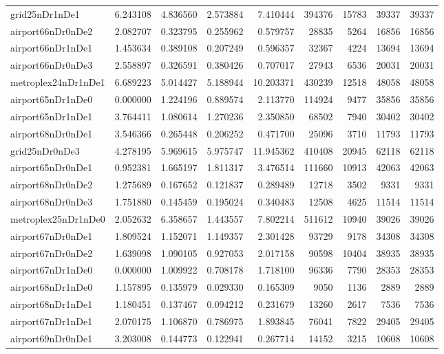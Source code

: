 \begin{longtable}{|l|r|r|r|r|r|r|r|r|}
grid25nDr1nDe1 & 6.243108 & 4.836560 & 2.573884 & 7.410444 & 394376 & 15783 & 39337 & 39337 \\
airport66nDr0nDe2 & 2.082707 & 0.323795 & 0.255962 & 0.579757 & 28835 & 5264 & 16856 & 16856 \\
airport66nDr1nDe1 & 1.453634 & 0.389108 & 0.207249 & 0.596357 & 32367 & 4224 & 13694 & 13694 \\
airport66nDr0nDe3 & 2.558897 & 0.326591 & 0.380426 & 0.707017 & 27943 & 6536 & 20031 & 20031 \\
metroplex24nDr1nDe1 & 6.689223 & 5.014427 & 5.188944 & 10.203371 & 430239 & 12518 & 48058 & 48058 \\
airport65nDr1nDe0 & 0.000000 & 1.224196 & 0.889574 & 2.113770 & 114924 & 9477 & 35856 & 35856 \\
airport65nDr1nDe1 & 3.764411 & 1.080614 & 1.270236 & 2.350850 & 68502 & 7940 & 30402 & 30402 \\
airport68nDr0nDe1 & 3.546366 & 0.265448 & 0.206252 & 0.471700 & 25096 & 3710 & 11793 & 11793 \\
grid25nDr0nDe3 & 4.278195 & 5.969615 & 5.975747 & 11.945362 & 410408 & 20945 & 62118 & 62118 \\
airport65nDr0nDe1 & 0.952381 & 1.665197 & 1.811317 & 3.476514 & 111660 & 10913 & 42063 & 42063 \\
airport68nDr0nDe2 & 1.275689 & 0.167652 & 0.121837 & 0.289489 & 12718 & 3502 & 9331 & 9331 \\
airport68nDr0nDe3 & 1.751880 & 0.145459 & 0.195024 & 0.340483 & 12508 & 4625 & 11514 & 11514 \\
metroplex25nDr1nDe0 & 2.052632 & 6.358657 & 1.443557 & 7.802214 & 511612 & 10940 & 39026 & 39026 \\
airport67nDr0nDe1 & 1.809524 & 1.152071 & 1.149357 & 2.301428 & 93729 & 9178 & 34308 & 34308 \\
airport67nDr0nDe2 & 1.639098 & 1.090105 & 0.927053 & 2.017158 & 90598 & 10404 & 38935 & 38935 \\
airport67nDr1nDe0 & 0.000000 & 1.009922 & 0.708178 & 1.718100 & 96336 & 7790 & 28353 & 28353 \\
airport68nDr1nDe0 & 1.157895 & 0.135979 & 0.029330 & 0.165309 & 9050 & 1136 & 2889 & 2889 \\
airport68nDr1nDe1 & 1.180451 & 0.137467 & 0.094212 & 0.231679 & 13260 & 2617 & 7536 & 7536 \\
airport67nDr1nDe1 & 2.070175 & 1.106870 & 0.786975 & 1.893845 & 76041 & 7822 & 29405 & 29405 \\
airport69nDr0nDe1 & 3.203008 & 0.144773 & 0.122941 & 0.267714 & 14152 & 3215 & 10608 & 10608 \\

\end{longtable}

